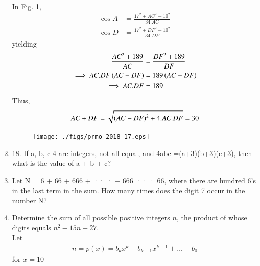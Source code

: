 \documentclass[journal,12pt,twocolumn]{IEEEtran}
\renewcommand\thesection{\arabic{section}}
\begin{document}
\begin{enumerate}[label=\thesection.\arabic*,ref=\thesection.\theenumi]
\\
\solution In Fig. \ref{fig:prmo_2018_17},
\begin{align}
\cos A &= \frac{17^2+AC^2-10^2}{34.AC}  
\\
\cos D &= \frac{17^2+DF^2-10^2}{34.DF}  
\end{align}
yielding
\begin{align}
 \frac{AC^2+189}{AC}   &= \frac{DF^2+189}{DF}  
\\
\implies AC.DF\left(AC-DF\right) &= 189\left(AC-DF\right)
\\
\implies AC.DF &= 189
\end{align}
%
Thus, 
\begin{align}
AC+DF = \sqrt{\left(AC-DF\right)^2+4.AC.DF} = 30
\end{align}

\begin{figure}[!ht]
\centering
\texttt{[image: ./figs/prmo\_2018\_17.eps]}
\caption{}
\label{fig:prmo_2018_17}
\end{figure}
\item 18. If a, b, c 
 4 are integers, not all equal, and 4abc =(a+3)(b+3)(c+3), then what is the value of a + b + c? 
\item  Let N = 6 + 66 + 666 + ·· · + 666 ·· · 66, where there are hundred 6’s in the last term in the sum. How many times does the digit 7 occur in the number N? 
\item  Determine the sum of all possible positive integers $n$, the product of whose digits equals $ n^2-15n-27$. 
\\
\solution Let 
\begin{align}
n = p(x) = b_kx^k+b_{k-1}x^{k-1}+\dots + b_0
\end{align}
for $x = 10$


\end{enumerate}
\end{document}
